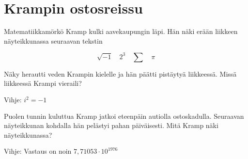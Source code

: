 \clearpage

\section{Krampin ostosreissu}

Matematiikkamörkö Kramp kulki aavekaupungin läpi. Hän näki erään liikkeen näyteikkunassa seuraavan tekstin

\begin{equation*}
    \sqrt{-1} \quad 2^3 \quad \sum \quad \pi
\end{equation*}

Näky herautti veden Krampin kielelle ja hän päätti pistäytyä liikkeessä. Missä liikkeessä Krampi vieraili?

Vihje: $i^2=-1$


Puolen tunnin kuluttua Kramp jatkoi eteenpäin autiolla ostoskadulla. Seuraavan näyteikkunan kohdalla hän pelästyi pahan päiväisesti. Mitä Kramp näki näyteikkunassa?

Vihje: Vastaus on noin $7{,}71053\cdot10^{1976}$